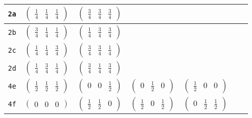 \documentclass[fleqn,9pt,landscape]{jsarticle}
\begin{document}
\begin{center}
\begin{longtable}{ccccccc}
{\tt 2a} & $ \begin{pmatrix} \frac{1}{4} & \frac{1}{4} & \frac{1}{4} \end{pmatrix} $ & $ \begin{pmatrix} \frac{3}{4} & \frac{3}{4} & \frac{3}{4} \end{pmatrix} $ & $  $ & $  $ & $  $ & $  $ \\ \hline
{\tt 2b} & $ \begin{pmatrix} \frac{3}{4} & \frac{1}{4} & \frac{1}{4} \end{pmatrix} $ & $ \begin{pmatrix} \frac{1}{4} & \frac{3}{4} & \frac{3}{4} \end{pmatrix} $ & $  $ & $  $ & $  $ & $  $ \\ \hline
{\tt 2c} & $ \begin{pmatrix} \frac{1}{4} & \frac{1}{4} & \frac{3}{4} \end{pmatrix} $ & $ \begin{pmatrix} \frac{3}{4} & \frac{3}{4} & \frac{1}{4} \end{pmatrix} $ & $  $ & $  $ & $  $ & $  $ \\ \hline
{\tt 2d} & $ \begin{pmatrix} \frac{1}{4} & \frac{3}{4} & \frac{1}{4} \end{pmatrix} $ & $ \begin{pmatrix} \frac{3}{4} & \frac{1}{4} & \frac{3}{4} \end{pmatrix} $ & $  $ & $  $ & $  $ & $  $ \\ \hline
{\tt 4e} & $ \begin{pmatrix} \frac{1}{2} & \frac{1}{2} & \frac{1}{2} \end{pmatrix} $ & $ \begin{pmatrix} 0 & 0 & \frac{1}{2} \end{pmatrix} $ & $ \begin{pmatrix} 0 & \frac{1}{2} & 0 \end{pmatrix} $ & $ \begin{pmatrix} \frac{1}{2} & 0 & 0 \end{pmatrix} $ & $  $ & $  $ \\ \hline
{\tt 4f} & $ \begin{pmatrix} 0 & 0 & 0 \end{pmatrix} $ & $ \begin{pmatrix} \frac{1}{2} & \frac{1}{2} & 0 \end{pmatrix} $ & $ \begin{pmatrix} \frac{1}{2} & 0 & \frac{1}{2} \end{pmatrix} $ & $ \begin{pmatrix} 0 & \frac{1}{2} & \frac{1}{2} \end{pmatrix} $ & $  $ & $  $ \\ \hline

\end{longtable}
\end{center}
\end{document}
